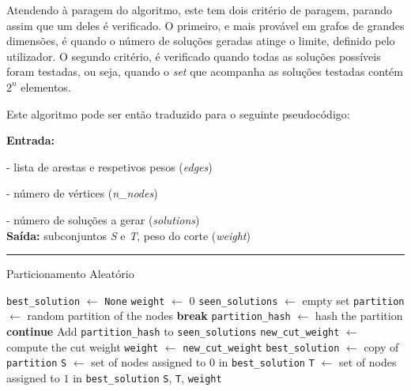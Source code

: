 \documentclass[mirror, portugues]{revdetua}
\begin{document}
Atendendo à paragem do algoritmo, este tem dois critério de paragem, parando assim que um deles é verificado. O primeiro, e mais provável em grafos de grandes dimensões, é quando o número de soluções geradas atinge o limite, definido pelo utilizador. O segundo critério, é verificado quando todas as soluções possíveis foram testadas, ou seja, quando o \textit{set} que acompanha as soluções testadas contém $2^n$ elementos.

Este algoritmo pode ser então traduzido para o seguinte pseudocódigo:

\begin{algorithm}[H]
\raggedright
\textbf{Entrada:}

- lista de arestas e respetivos pesos (\textit{edges})

- número de vértices (\textit{n\_nodes})

- número de soluções a gerar (\textit{solutions})\\
\textbf{Saída:} subconjuntos \textit{S} e \textit{T}, peso do corte (\textit{weight}) \\
\hrule 
\caption{Particionamento Aleatório}
\begin{algorithmic}[1]
    \State \texttt{best\_solution} $\gets$ \texttt{None}
    \State \texttt{weight} $\gets$ 0
    \State \texttt{seen\_solutions} $\gets$ empty set
        \State \texttt{partition} $\gets$ random partition of the nodes
            \State \textbf{break}
        \EndIf
        \State \texttt{partition\_hash} $\gets$ hash the partition
            \State \textbf{continue}
        \EndIf
        \State Add \texttt{partition\_hash} to \texttt{seen\_solutions}
        \State \texttt{new\_cut\_weight} $\gets$ compute the cut weight
            \State \texttt{weight} $\gets$ \texttt{new\_cut\_weight}
            \State \texttt{best\_solution} $\gets$ copy of \texttt{partition}
        \EndIf
    \EndFor
    \State \texttt{S} $\gets$ set of nodes assigned to $0$ in \texttt{best\_solution}
    \State \texttt{T} $\gets$ set of nodes assigned to $1$ in \texttt{best\_solution}
    \Return \texttt{S}, \texttt{T}, \texttt{weight}
\end{algorithmic}
\end{algorithm}
    

\end{document}

